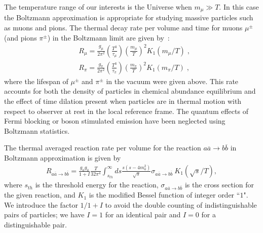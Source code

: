 The temperature range of our interests is the Universe when $m_\mu\gg T$. In this case the Boltzmann approximation is appropriate for studying massive particles such as muons and pions. The thermal decay rate per volume and time for muons $\mu^\pm$ (and pions $\pi^\pm$) in the Boltzmann limit are given by~\cite{Kuznetsova:2010pi}:
\begin{align}
&R_\mu=\frac{g_\mu}{2\pi^2}\left(\frac{T^3}{\tau_\mu}\right)\left(\frac{m_\mu}{T}\right)^2K_1(m_\mu/T)\;,\\
&R_\pi=\frac{g_\pi}{2\pi^2}\left(\frac{T^3}{\tau_\pi}\right)\left(\frac{m_\pi}{T}\right)^2K_1(m_\pi/T)\;, 
\end{align}
where the lifespan of $\mu^\pm$ and $\pi^\pm$ in the vacuum were given above. This rate accounts for both the density of particles in chemical abundance equilibrium and the effect of time dilation present when particles are in thermal motion with respect to observer at rest in the local reference frame. The quantum effects of Fermi blocking or boson stimulated emission have been neglected using Boltzmann statistics.

The thermal averaged reaction rate per volume for the reaction $a\overline{a}\rightarrow b\overline{b}$ in Boltzmann approximation is given by~\cite{Letessier:2002ony}
\begin{align}\label{pairR}
R_{a\overline{a}\rightarrow b\overline{b}}=\frac{g_ag_{\overline{a}}}{1+I}\frac{T}{32\pi^4}\int_{s_{th}}^\infty ds\frac{s(s-4m^2_a)}{\sqrt{s}}\sigma_{a\overline{a}\rightarrow b\overline{b}}~K_1(\sqrt{s}/T),
\end{align}
where $s_{th}$ is the threshold energy for the reaction, $\sigma_{a\overline{a}\rightarrow b\overline{b}}$ is the cross section for the given reaction, and $K_1$ is the modified
Bessel function of integer order ``$1$". We introduce the factor $1/1+I$ to avoid the double counting of indistinguishable pairs of particles; we have $I=1$ for an identical pair and $I=0$ for a distinguishable pair.

